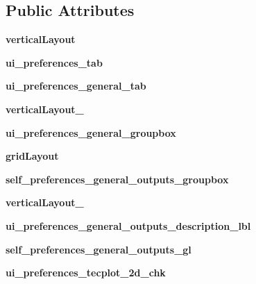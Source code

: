 \subsection*{Public Attributes}
\begin{DoxyCompactItemize}
\item 
\hypertarget{a00113_ad769696a12317c7f92ed3366311bc496}{}\label{a00113_ad769696a12317c7f92ed3366311bc496} 
{\bfseries vertical\+Layout}
\item 
\hypertarget{a00113_aefabfa9bb4d3ece796fee13c167d52fc}{}\label{a00113_aefabfa9bb4d3ece796fee13c167d52fc} 
{\bfseries ui\+\_\+preferences\+\_\+tab}
\item 
\hypertarget{a00113_a0f603694eed0cda9d39a0d9bc19c2e10}{}\label{a00113_a0f603694eed0cda9d39a0d9bc19c2e10} 
{\bfseries ui\+\_\+preferences\+\_\+general\+\_\+tab}
\item 
\hypertarget{a00113_af50058d66700f51fb46a0bab1cf0aa4b}{}\label{a00113_af50058d66700f51fb46a0bab1cf0aa4b} 
{\bfseries vertical\+Layout\+\_}
\item 
\hypertarget{a00113_adca7b98e8183192a5fc165c8695d44f5}{}\label{a00113_adca7b98e8183192a5fc165c8695d44f5} 
{\bfseries ui\+\_\+preferences\+\_\+general\+\_\+groupbox}
\item 
\hypertarget{a00113_a9758be9a7207723c709109813da770fb}{}\label{a00113_a9758be9a7207723c709109813da770fb} 
{\bfseries grid\+Layout}
\item 
\hypertarget{a00113_a2dbc9c7187826d35dfb423e2536031c1}{}\label{a00113_a2dbc9c7187826d35dfb423e2536031c1} 
{\bfseries self\+\_\+preferences\+\_\+general\+\_\+outputs\+\_\+groupbox}
\item 
\hypertarget{a00113_af17928a62255c96603422710076dbede}{}\label{a00113_af17928a62255c96603422710076dbede} 
{\bfseries vertical\+Layout\+\_}
\item 
\hypertarget{a00113_a47018f6a822750d843c3ba200c5dfdd5}{}\label{a00113_a47018f6a822750d843c3ba200c5dfdd5} 
{\bfseries ui\+\_\+preferences\+\_\+general\+\_\+outputs\+\_\+description\+\_\+lbl}
\item 
\hypertarget{a00113_aec77d619b1316cf81f501262151d4388}{}\label{a00113_aec77d619b1316cf81f501262151d4388} 
{\bfseries self\+\_\+preferences\+\_\+general\+\_\+outputs\+\_\+gl}
\item 
\hypertarget{a00113_a99ea63136960e76164e086bee4b6acb5}{}\label{a00113_a99ea63136960e76164e086bee4b6acb5} 
{\bfseries ui\+\_\+preferences\+\_\+tecplot\+\_\+2d\+\_\+chk}
\item 
\hypertarget{a00113_ab28264229e6a9e05bf21541ed645dcb2}{}\label{a00113_ab28264229e6a9e05bf21541ed645dcb2} 

\end{DoxyCompactItemize}
